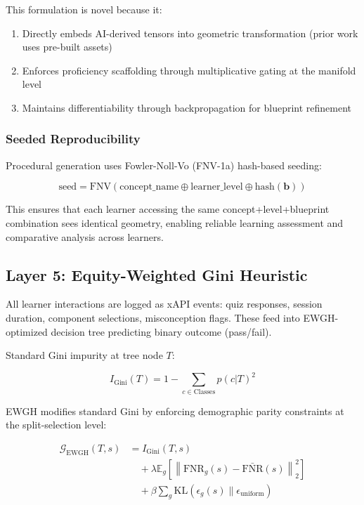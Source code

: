 \documentclass[conference]{IEEEtran}
\begin{document}
This formulation is novel because it:
\begin{enumerate}
    \item Directly embeds AI-derived tensors into geometric transformation (prior work uses pre-built assets)
    \item Enforces proficiency scaffolding through multiplicative gating at the manifold level
    \item Maintains differentiability through backpropagation for blueprint refinement
\end{enumerate}

\subsubsection{Seeded Reproducibility}

Procedural generation uses Fowler-Noll-Vo (FNV-1a) hash-based seeding:

\begin{equation}
\text{seed} = \text{FNV}(\text{concept\_name} \oplus \text{learner\_level} \oplus \text{hash}(\mathbf{b}))
\end{equation}

This ensures that each learner accessing the same concept+level+blueprint combination sees identical geometry, enabling reliable learning assessment and comparative analysis across learners.

\subsection{Layer 5: Equity-Weighted Gini Heuristic}

All learner interactions are logged as xAPI events: quiz responses, session duration, component selections, misconception flags. These feed into EWGH-optimized decision tree predicting binary outcome (pass/fail).

Standard Gini impurity at tree node $T$:

\begin{equation}
I_{\text{Gini}}(T) = 1 - \sum_{c \in \text{Classes}} p(c | T)^2
\end{equation}

EWGH modifies standard Gini by enforcing demographic parity constraints at the split-selection level:

\begin{equation}
\begin{split}
\mathcal{G}_{\text{EWGH}}(T, s) &= I_{\text{Gini}}(T, s) \\
&\quad + \lambda \mathbb{E}_g\left[ \left\| \text{FNR}_g(s) - \bar{\text{FNR}}(s) \right\|_2^2 \right] \\
&\quad + \beta \sum_g \text{KL}\left(\epsilon_g(s) \| \epsilon_{\text{uniform}} \right)
\end{split}
\label{eq:ewgh_novel}
\end{equation}
\end{document}
